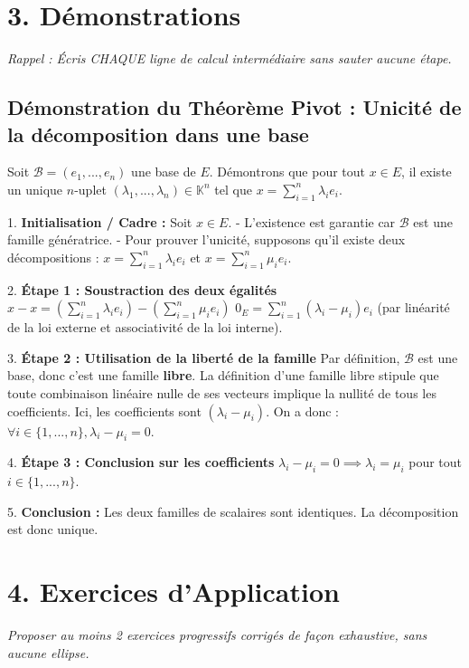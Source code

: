 \documentclass{report}
\begin{document}
\section*{3. Démonstrations}
\textit{Rappel : Écris CHAQUE ligne de calcul intermédiaire sans sauter aucune étape.}

\subsection*{Démonstration du Théorème Pivot : Unicité de la décomposition dans une base}
Soit $\mathcal{B} = (e_1, ..., e_n)$ une base de $E$. Démontrons que pour tout $x \in E$, il existe un unique $n$-uplet $(\lambda_1, ..., \lambda_n) \in \mathbb{K}^n$ tel que $x = \sum_{i=1}^n \lambda_i e_i$.

1. \textbf{Initialisation / Cadre :} Soit $x \in E$.
   - L'existence est garantie car $\mathcal{B}$ est une famille génératrice.
   - Pour prouver l'unicité, supposons qu'il existe deux décompositions :
     $x = \sum_{i=1}^n \lambda_i e_i$ et $x = \sum_{i=1}^n \mu_i e_i$.

2. \textbf{Étape 1 : Soustraction des deux égalités}
   $x - x = \left( \sum_{i=1}^n \lambda_i e_i \right) - \left( \sum_{i=1}^n \mu_i e_i \right)$
   $0_E = \sum_{i=1}^n (\lambda_i - \mu_i) e_i$ (par linéarité de la loi externe et associativité de la loi interne).

3. \textbf{Étape 2 : Utilisation de la liberté de la famille}
   Par définition, $\mathcal{B}$ est une base, donc c'est une famille \textbf{libre}.
   La définition d'une famille libre stipule que toute combinaison linéaire nulle de ses vecteurs implique la nullité de tous les coefficients.
   Ici, les coefficients sont $(\lambda_i - \mu_i)$.
   On a donc : $\forall i \in \{1, ..., n\}, \lambda_i - \mu_i = 0$.

4. \textbf{Étape 3 : Conclusion sur les coefficients}
   $\lambda_i - \mu_i = 0 \implies \lambda_i = \mu_i$ pour tout $i \in \{1, ..., n\}$.

5. \textbf{Conclusion :} Les deux familles de scalaires sont identiques. La décomposition est donc unique.

\section*{4. Exercices d'Application}
\textit{Proposer au moins 2 exercices progressifs corrigés de façon exhaustive, sans aucune ellipse.}
\end{document}
